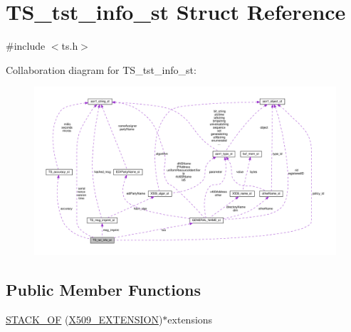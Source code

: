 \hypertarget{struct_t_s__tst__info__st}{}\section{T\+S\+\_\+tst\+\_\+info\+\_\+st Struct Reference}
\label{struct_t_s__tst__info__st}


{\ttfamily \#include $<$ts.\+h$>$}



Collaboration diagram for T\+S\+\_\+tst\+\_\+info\+\_\+st\+:
\nopagebreak
\begin{figure}[H]
\begin{center}
\leavevmode
\includegraphics[width=350pt]{struct_t_s__tst__info__st__coll__graph}
\end{center}
\end{figure}
\subsection*{Public Member Functions}
\begin{DoxyCompactItemize}
\item 
\hyperlink{struct_t_s__tst__info__st_a005cc83d9dfc1fb59387d1220dd02de5}{S\+T\+A\+C\+K\+\_\+\+OF} (\hyperlink{x509_8h_ab2f7f7dc0ced8684e0cbfc818e408304}{X509\+\_\+\+E\+X\+T\+E\+N\+S\+I\+ON})$\ast$extensions
\end{DoxyCompactItemize}
